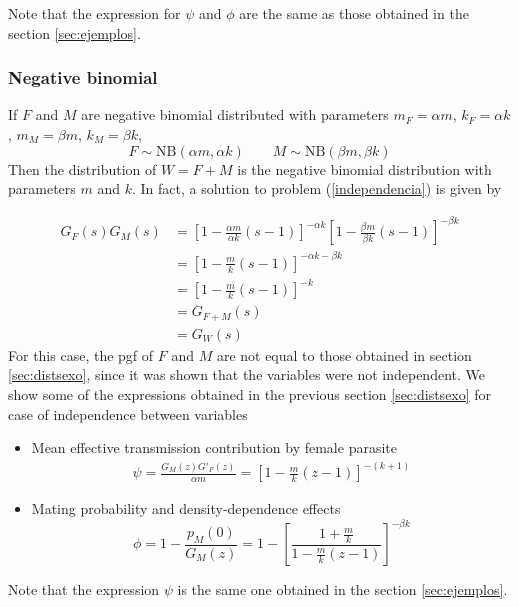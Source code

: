 \documentclass[useAMS,referee,usenatbib]{biom}
\begin{document}
Note that the expression for $\psi$ and $\phi$ are the same as those obtained in the section \ref{sec:ejemplos}.

\subsubsection{Negative binomial}

If $F$ and $M$ are negative binomial distributed with parameters $m_F=\alpha m$, $k_F=\alpha k$, $m_M=\beta m$, $k_M=\beta k$, 
\begin{equation*}
F\sim \mathrm{NB}(\alpha m,\alpha k) \qquad M\sim \mathrm{NB}(\beta m,\beta k)
\end{equation*}  
Then the distribution of $W=F+M$ is the negative binomial distribution with parameters $m$ and $k$. In fact,  a solution to problem (\ref{independencia}) is given by

\begin{align*}
G_F(s)G_M(s)&=\left[ 1-\frac{\alpha m}{\alpha k}(s-1)\right] ^{-\alpha k} \left[ 1-\frac{\beta m}{\beta k}(s-1)\right] ^{-\beta k}\\
&=\left[ 1-\frac{m}{k}(s-1)\right] ^{-\alpha k-\beta k}\\
&=\left[ 1- \frac{m}{k}(s-1) \right] ^{-k}\\
&=G_{F+M}(s)\\
&=G_W(s)
\end{align*}
For this case, the pgf of $F$ and $M$ are not equal to those obtained in section \ref{sec:distsexo}, since it was shown that the variables were not independent. We show some of the expressions obtained in the previous section \ref{sec:distsexo} for case of independence between variables 
\begin{itemize}
	\item Mean effective transmission contribution by female parasite
	\begin{align}
	\psi=\frac{G_M(z)G'_F(z)}{\alpha m}=\left[ 1-\frac{m}{k}(z-1)\right] ^{-(k+1)}
	\end{align}
	
	\item Mating probability and density-dependence effects
	\begin{equation}
	\phi= 1-\frac{p_M(0)}{G_M(z)}=1-\left[ \frac{1+\frac{m}{k}}{1-\frac{m}{k}(z-1)}\right]^{-\beta k} 
	\end{equation}
\end{itemize}
Note that the expression $\psi$ is the same one obtained in the section \ref{sec:ejemplos}.
\end{document}
